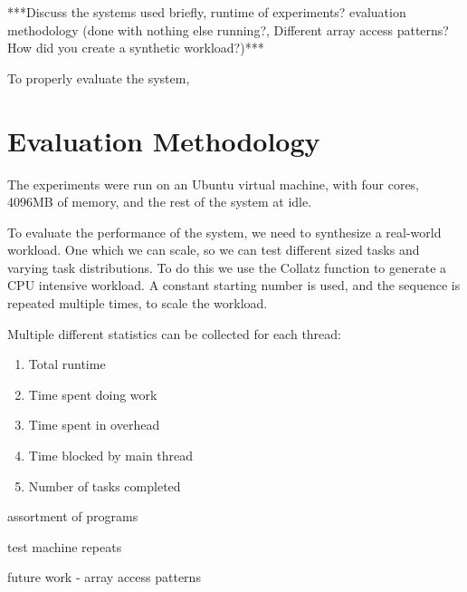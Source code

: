 
***Discuss the systems used briefly, runtime of experiments? evaluation methodology (done with nothing else running?, Different array access patterns? How did you create a synthetic workload?)***

To properly evaluate the system, 



\section{Evaluation Methodology}

The experiments were run on an Ubuntu virtual machine, with four cores, 4096MB of memory, and the rest of the system at idle.

To evaluate the performance of the system, we need to synthesize a real-world workload. One which we can scale, so we can test different sized tasks and varying task distributions. To do this we use the Collatz function to generate a CPU intensive workload. A constant starting number is used, and the sequence is repeated multiple times, to scale the workload.

Multiple different statistics can be collected for each thread:

\begin{enumerate}
	\item Total runtime
	\item Time spent doing work
	\item Time spent in overhead
	\item Time blocked by main thread
	\item Number of tasks completed
\end{enumerate}

assortment of programs

test machine
repeats

future work - array access patterns